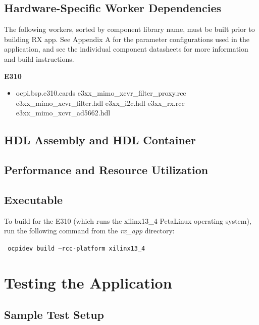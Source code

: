 \subsection{Hardware-Specific Worker Dependencies}
The following workers, sorted by component library name, must be built prior to building RX app. See Appendix A for the parameter configurations used in the application, and see the individual component datasheets for more information and build instructions.\par\bigskip
	\begin{minipage}[t]{\textwidth}
	\textbf{E310}
	\begin{itemize}
		\item ocpi.bsp.e310.cards
			\subitem e3xx\_mimo\_xcvr\_filter\_proxy.rcc
			\subitem e3xx\_mimo\_xcvr\_filter.hdl
			\subitem e3xx\_i2c.hdl
			\subitem e3xx\_rx.rcc
			\subitem e3xx\_mimo\_xcvr\_ad5662.hdl
	\end{itemize}
	\end{minipage} \medskip

\newpage

\subsection{HDL Assembly and HDL Container}
\assetsdoc
\begin{landscape}
\subsection{Performance and Resource Utilization}

\end{landscape}

\subsection{Executable}
\noindent To build for the E310 (which runs the xilinx13\_4 PetaLinux operating system), run the following command from the \textit{rx\_app} directory:\par\medskip
\texttt{ ocpidev build --rcc-platform xilinx13\_4 }\par\medskip
\assetsdoc
\section{Testing the Application}
\subsection{Sample Test Setup}
\assetsdoc
